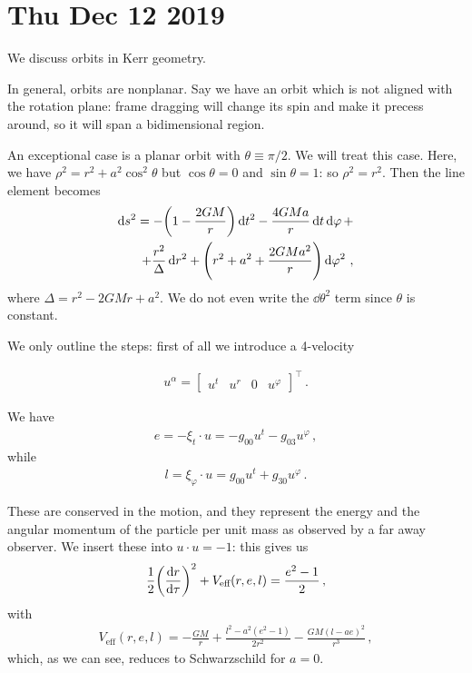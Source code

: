 \documentclass[main.tex]{subfiles}
\begin{document}
\section*{Thu Dec 12 2019}

We discuss orbits in Kerr geometry. 

In general, orbits are nonplanar. Say we have an orbit which is not aligned with the rotation plane: frame dragging will change its spin and make it precess around, so it will span a bidimensional region. 

An exceptional case is a planar orbit with \(\theta \equiv \pi /2\). 
We will treat this case. Here, we have \(\rho^2 = r^2 + a^2 \cos^2 \theta \) but \(\cos \theta =0\) and \(\sin \theta = 1\): so \(\rho^2 = r^2\). Then the line element becomes 
%
\begin{subequations}
\begin{align}
  \begin{split}
      \dd{s^2} = - \qty(1 - \frac{2GM}{r}) \dd{t^2} 
      - \frac{4GMa}{r} \dd{t} \dd{\varphi } + \\
      + \frac{r^2}{\Delta } \dd{r^2} + \qty(r^2+ a^2 + \frac{2GMa^2}{r}) \dd{\varphi^2}
      \,,
  \end{split}
\end{align}
\end{subequations}
%
where \(\Delta = r^2 - 2GMr + a^2\). We do not even write the \(\dd{\theta^2}\) term since \(\theta \) is constant. 

We only outline the steps: first of all we introduce a 4-velocity 


%
\begin{align}
    u^{\alpha } = \left[\begin{array}{cccc}
        u^{t} & u^{r} & 0 & u^{\varphi }
    \end{array}\right]^{\top}
\,.
\end{align}

We have 
%
\begin{align}
  e = - \xi_{t} \cdot u = - g_{00} u^{t} - g_{03} u^{\varphi }
\,,
\end{align}
%
while 
%
\begin{align}
  l = \xi_{\varphi } \cdot u = g_{00} u^{t} + g_{30} u^{\varphi }
\,.
\end{align}

These are conserved in the motion, and they represent the energy and the angular momentum of the particle per unit mass as observed by a far away observer.
We insert these into \(u \cdot u = -1\): this gives us 
%
\begin{align}
 \frac{1}{2} \qty(\dv{r}{\tau })^2 + V _{\text{eff}} (r, e, l) = \frac{e^2 - 1}{2}
\,,
\end{align}
%
with 
%
\begin{align}
  V _{\text{eff}} (r, e, l)  = -\frac{GM}{r} + \frac{l^2 - a^2 (e^2-1)}{2r^2} - \frac{GM(l - ae)^2}{r^3} 
\,,
\end{align}
%
which, as we can see, reduces to Schwarzschild for \(a=0\). 
\end{document}
